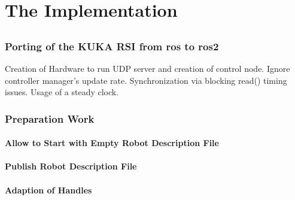 \part{The Implementation}
\chapter{}
\label{sec:implementation}

\section{Porting of the KUKA RSI from \gls{ros} to \gls{ros2} }
Creation of Hardware to run UDP server and creation of control node. Ignore controller manager's update rate. Synchronization via blocking read() timing issues. Usage of a steady clock.

\section{Preparation Work}

\subsection{Allow to Start with Empty Robot Description File}

\subsection{Publish Robot Description File}

\subsection{Adaption of Handles}

